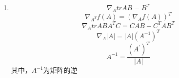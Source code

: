 \begin{enumerate}
	\item 
	\begin{equation}
		\nabla_AtrAB = B^T
	\end{equation}
	\begin{equation}
		\nabla_{A^T}f(A) = (\nabla_Af(A))^T
	\end{equation}
	\begin{equation}
		\nabla_AtrABA^TC = CAB + C^TAB^T
	\end{equation}
	\begin{equation}
		\nabla_A|A| = |A|(A^{-1})^T
	\end{equation}
	\begin{equation}
		A^{-1} = \frac{(A^{'})^T}{|A|}
	\end{equation}
	其中，$A^{-1}$为矩阵的逆



\end{enumerate}


















